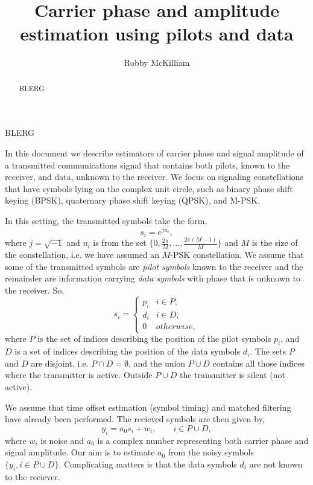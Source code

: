\documentclass[journal]{IEEEtran}
\title{Carrier phase and amplitude estimation using pilots and data}
\author{Robby McKilliam}
\begin{document}
\maketitle

\begin{abstract}
BLERG
\end{abstract}
\begin{IEEEkeywords}
BLERG
\end{IEEEkeywords}

In this document we describe estimators of carrier phase and signal amplitude of a transmitted communications signal that contains both pilots, known to the receiver, and data, unknown to the receiver.  We focus on signaling constellations that have symbols lying on the complex unit circle, such as binary phase shift keying (BPSK), quaternary phase shift keying (QPSK), and M-PSK.  

In this setting, the transmitted symbols take the form,
\[
s_i = e^{j u_i},
\]
where $j = \sqrt{-1}$ and $u_i$ is from the set $\{0, \tfrac{2\pi}{M}, \dots, \tfrac{2\pi(M-1)}{M}\}$ and $M$ is the size of the constellation, i.e. we have assumed an $M$-PSK constellation.  We assume that some of the transmitted symbols are \emph{pilot symbols} known to the receiver and the remainder are information carrying \emph{data symbols} with phase that is unknown to the receiver.  So,
\[
s_i = \begin{cases}
p_i & i \in P, \\
d_i & i \in D, \\
0 & otherwise,
\end{cases}
\]
where $P$ is the set of indices describing the position of the pilot symbols $p_i$, and $D$ is a set of indices describing the position of the data symbols $d_i$.  The sets $P$ and $D$ are disjoint, i.e. $P \cap D = \emptyset$, and the union $P \cup D$ contains all those indices where the transmitter is active.  Outside $P \cup D$ the transmitter is silent (not active).  

We assume that time offset estimation (symbol timing) and matched filtering have already been performed.  The recieved symbols are then given by,
\begin{equation}\label{eq:sigmod}
y_i = a_0 s_i + w_i, \qquad i \in P \cup D,
\end{equation}
where $w_i$ is noise and $a_0$ is a complex number representing both carrier phase and signal amplitude.  Our aim is to estimate $a_0$ from the noisy symbols $\{ y_i, i \in P \cup D \}$.  Complicating matters is that the data symbols $d_i$ are not known to the reciever.  
\end{document}
